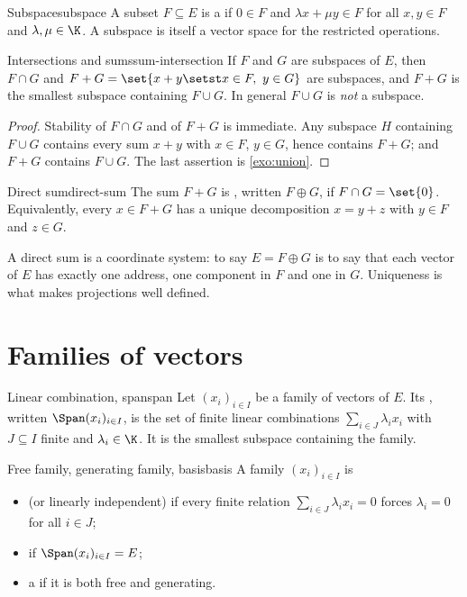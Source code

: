 \begin{definition}{Subspace}{subspace}
A subset $F\subseteq E$ is a  if $0\in F$ and
$\lambda x+\mu y\in F$ for all $x,y\in F$ and $\lambda,\mu\in\K$. A subspace is
itself a vector space for the restricted operations.
\end{definition}

\begin{proposition}{Intersections and sums}{sum-intersection}
If $F$ and $G$ are subspaces of $E$, then $F\cap G$ and
$F+G=\set{x+y\setst x\in F,\ y\in G}$ are subspaces, and $F+G$ is the smallest
subspace containing $F\cup G$. In general $F\cup G$ is \emph{not} a subspace.
\end{proposition}

\begin{proof}
Stability of $F\cap G$ and of $F+G$ is immediate. Any subspace $H$ containing
$F\cup G$ contains every sum $x+y$ with $x\in F$, $y\in G$, hence contains
$F+G$; and $F+G$ contains $F\cup G$. The last assertion is \cref{exo:union}.
\end{proof}

\begin{definition}{Direct sum}{direct-sum}
The sum $F+G$ is , written $F\oplus G$, if $F\cap G=\set{0}$.
Equivalently, every $x\in F+G$ has a unique decomposition $x=y+z$ with $y\in F$
and $z\in G$.
\end{definition}

\begin{intuition}
A direct sum is a coordinate system: to say $E=F\oplus G$ is to say that each
vector of $E$ has exactly one address, one component in $F$ and one in $G$.
Uniqueness is what makes projections well defined.
\end{intuition}

\section{Families of vectors}

\begin{definition}{Linear combination, span}{span}
Let $(x_i)_{i\in I}$ be a family of vectors of $E$. Its , written
$\Span(x_i)_{i\in I}$, is the set of finite linear combinations
$\sum_{i\in J}\lambda_i x_i$ with $J\subseteq I$ finite and $\lambda_i\in\K$. It
is the smallest subspace containing the family.
\end{definition}

\begin{definition}{Free family, generating family, basis}{basis}
A family $(x_i)_{i\in I}$ is
\begin{itemize}
  \item {} (or linearly independent) if every finite relation
        $\sum_{i\in J}\lambda_i x_i=0$ forces $\lambda_i=0$ for all $i\in J$;
  \item {} if $\Span(x_i)_{i\in I}=E$;
  \item a  if it is both free and generating.
\end{itemize}
\end{definition}

